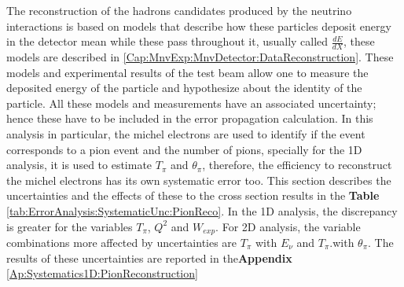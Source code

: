 The reconstruction of the hadrons candidates produced by the neutrino interactions is based on models that describe how these particles deposit energy in the detector mean while these pass throughout it, usually called $\frac{dE}{dX}$, these models are described in \ref{Cap:MnvExp:MnvDetector:DataReconstruction}. These models and experimental results of the test beam allow one to measure the deposited energy of the particle and hypothesize about the identity of the particle. All these models and measurements have an associated uncertainty; hence these have to be included in the error propagation calculation. In this analysis in particular, the michel electrons are used to identify if the event corresponds to a pion event and the number of pions, specially for the 1D analysis, it is used to estimate $T_\pi$ and $\theta_\pi$, therefore, the efficiency to reconstruct the michel electrons has its own systematic error too. This section describes the uncertainties and the effects of these to the cross section results in the \textbf{Table} \ref{tab:ErrorAnalysis:SystematicUnc:PionReco}. In the 1D analysis, the discrepancy is greater for the variables $T_\pi$, $Q^2$ and $W_{exp}$. For 2D analysis, the variable combinations more affected by uncertainties are $T_\pi$ with $E_\nu$ and $T_\pi$.with $\theta_\pi$. The results of these uncertainties are reported in the\textbf{Appendix} \ref{Ap:Systematics1D:PionReconstruction}

